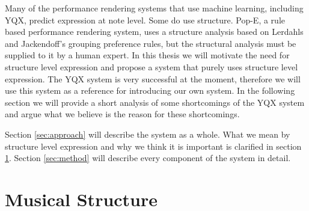 \documentclass[a4paper,10pt]{article}
\begin{document}
Many of the performance rendering systems that use machine learning, including YQX, predict expression at note level. Some do use structure. Pop-E\cite{hashida2006pop}, a rule based performance rendering system, uses a structure analysis based on Lerdahls and Jackendoff's grouping preference rules, but the structural analysis must be supplied to it by a human expert. In this thesis we will motivate the need for structure level expression and propose a system that purely uses structure level expression. The YQX system is very successful at the moment, therefore we will use this system as a reference for introducing our own system. In the following section we will provide a short analysis of some shortcomings of the YQX system and argue what we believe is the reason for these shortcomings.

Section \ref{sec:approach} will describe the system as a whole. What we mean by structure level expression and why we think it is important is clarified in section \ref{sec:structure}. Section \ref{sec:method} will describe every component of the system in detail. 




\section{Musical Structure}
\label{sec:structure}
\end{document}

